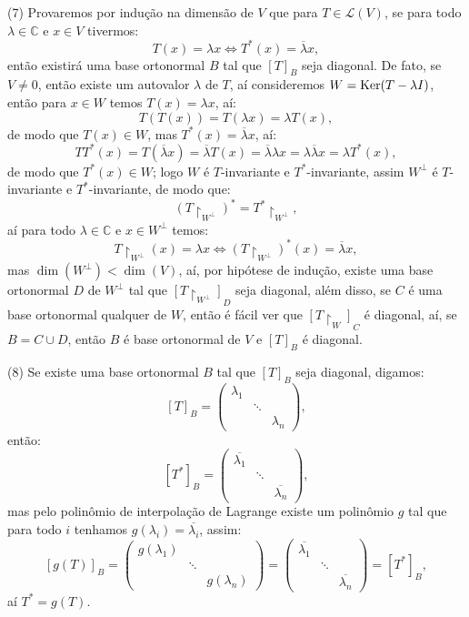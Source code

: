 \documentclass[11pt,a4paper]{article}
\begin{document}
{\bigskip
\noindent
(7) Provaremos por indução na dimensão de $V$ que para $T\in\mathcal{L}(V)$, se para todo $\lambda\in\mathbb{C}$ e $x\in V$ tivermos:
\[
T(x)=\lambda x\Leftrightarrow T^*(x)=\overline{\lambda}x,
\]
então existirá uma base ortonormal $B$ tal que $[T]_B$ seja diagonal. De fato, se $V\neq 0$, então existe um autovalor $\lambda$ de $T$, aí consideremos $W=\operatorname{Ker}(T-\lambda I)$, então para $x\in W$ temos $T(x)=\lambda x$, aí:
\[
T(T(x))=T(\lambda x)=\lambda T(x),
\]
de modo que $T(x)\in W$, mas $T^*(x)=\overline{\lambda}x$, aí:
\[
TT^*(x)=T(\overline{\lambda}x)=\overline{\lambda}T(x)=\overline{\lambda}\lambda x=\lambda\overline{\lambda}x=\lambda T^*(x),
\]
de modo que $T^*(x)\in W$; logo $W$ é $T$-invariante e $T^*$-invariante, assim $W^\perp$ é $T$-invariante e $T^*$-invariante, de modo que:
\[
(T\upharpoonright_{W^\perp})^*=T^*\upharpoonright_{W^\perp},
\]
aí para todo $\lambda\in\mathbb{C}$ e $x\in W^\perp$ temos:
\[
T\upharpoonright_{W^\perp}(x)=\lambda x\Leftrightarrow(T\upharpoonright_{W^\perp})^*(x)=\overline{\lambda}x,
\]
mas $\dim(W^\perp)<\dim(V)$, aí, por hipótese de indução, existe uma base ortonormal $D$ de $W^\perp$ tal que $[T\upharpoonright_{W^\perp}]_D$ seja diagonal, além disso, se $C$ é uma base ortonormal qualquer de $W$, então é fácil ver que $[T\upharpoonright_W]_C$ é diagonal, aí, se $B=C\cup D$, então $B$ é base ortonormal de $V$ e $[T]_B$ é diagonal.

\bigskip
\noindent
(8) Se existe uma base ortonormal $B$ tal que $[T]_B$ seja diagonal, digamos:
\[
[T]_B=\begin{pmatrix}
\lambda_1&&\\&\ddots&\\&&\lambda_n
\end{pmatrix},
\]
então:
\[
[T^*]_B=\begin{pmatrix}
\overline{\lambda_1}&&\\&\ddots&\\&&\overline{\lambda_n}
\end{pmatrix},
\]
mas pelo polinômio de interpolação de Lagrange existe um polinômio $g$ tal que para todo $i$ tenhamos $g(\lambda_i)=\overline{\lambda_i}$, assim:
\[
[g(T)]_B=\begin{pmatrix}
g(\lambda_1)&&\\&\ddots&\\&&g(\lambda_n)
\end{pmatrix}=\begin{pmatrix}
\overline{\lambda_1}&&\\&\ddots&\\&&\overline{\lambda_n}
\end{pmatrix}=[T^*]_B,
\]
aí $T^*=g(T)$.

}
\end{document}
